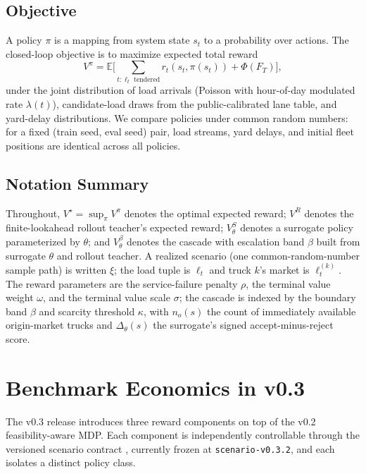 \documentclass[11pt]{article}
\begin{document}
\subsection{Objective}

A policy $\pi$ is a mapping from system state $s_t$ to a probability over
actions. The closed-loop objective is to maximize expected total reward
\begin{equation}
  V^\pi = \mathbb{E}\Biggl[\sum_{t : \ell_t \text{ tendered}}
  r_t(s_t, \pi(s_t)) + \Phi(F_T) \Biggr],
\end{equation}
under the joint distribution of load arrivals (Poisson with hour-of-day
modulated rate $\lambda(t)$), candidate-load draws from the
public-calibrated lane table, and yard-delay distributions. We compare
policies under common random numbers: for a fixed (train seed, eval seed)
pair, load streams, yard delays, and initial fleet positions are
identical across all policies.

\subsection{Notation Summary}

Throughout, $V^\star = \sup_\pi V^\pi$ denotes the optimal expected reward;
$V^{R}$ denotes the finite-lookahead rollout teacher's expected reward;
$V^{S}_\theta$ denotes a surrogate policy parameterized by $\theta$; and
$V^{\beta}_\theta$ denotes the cascade with escalation band $\beta$ built
from surrogate $\theta$ and rollout teacher. A realized scenario (one
common-random-number sample path) is written $\xi$; the load tuple is
$\ell_t$ and truck $k$'s market is $\ell^{(k)}_t$. The reward parameters
are the service-failure penalty $\rho$, the terminal value weight
$\omega$, and the terminal value scale $\sigma$; the cascade is indexed by
the boundary band $\beta$ and scarcity threshold $\kappa$, with
$n_o(s)$ the count of immediately available origin-market trucks and
$\Delta_\theta(s)$ the surrogate's signed accept-minus-reject score.

\section{Benchmark Economics in v0.3}
\label{sec:economics}

The v0.3 release introduces three reward components on top of the v0.2
feasibility-aware MDP. Each component is independently controllable through
the versioned scenario contract
, currently frozen at
\texttt{scenario-v0.3.2}, and each isolates a distinct policy class.
\end{document}
